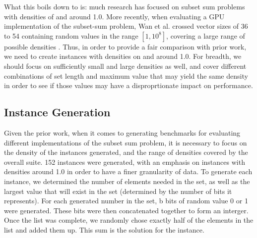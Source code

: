 \documentclass{article}
\begin{document}
What this boils down to is: much research has focused on subset sum problems with
densities of and around 1.0. More recently, when evaluating a GPU
implementation of the subset-sum problem, Wan et al. crossed vector sizes of
36 to 54 containing random values in the range $[1, 10^8]$, covering a large
range of possible densities \cite {wan2015}. Thus, in order to provide a fair
comparison with prior work, we need to create instances with densities
on and around 1.0. For breadth, we should focus on sufficiently small and large
densities as well, and cover different combinations of set length and maximum
value that may yield the same density in order to see if those values
may have a disproprtionate impact on performance. 

\subsection{Instance Generation}
Given the prior work, when it comes to generating benchmarks for evaluating different
implementations of the subset sum problem, it is necessary to focus on the density of
the instances generated, and the range of densities covered by the overall suite.
152 instances were generated, with an emphasis on instances with densities around
1.0 in order to have a finer granularity of data. To generate each instance, we
determined the number of elements needed in the set, as well as the largest
value that will exist in the set (determined by the number of bits it represents).
For each generated number in the set, b bits of random value 0 or 1 were generated.
These bits were then concatenated together to form an interger.
Once the list was complete, we randomly chose exactly half of the elements in the
list and added them up. This sum is the solution for the instance.
\end{document}
